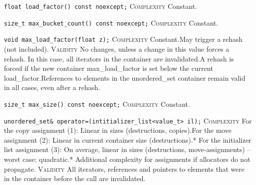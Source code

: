 \noindent{}\hspace*{0.25em}\lstinline[basicstyle=\ttfamily\color{cgreen}]{float load_factor() const noexcept;} \textsc{Complexity} Constant.\\\vspace{-0.6em}

\noindent{}\hspace*{0.25em}\lstinline[basicstyle=\ttfamily\color{cgreen}]{size_t max_bucket_count() const noexcept;} \textsc{Complexity} Constant.\\\vspace{-0.6em}

\noindent{}\hspace*{0.25em}\lstinline[basicstyle=\ttfamily\color{cgreen}]{void max_load_factor(float z);} \textsc{Complexity} Constant.May trigger a rehash (not included). \textsc{Validity} No changes, unless a change in this value forces a rehash. In this case, all iterators in the container are invalidated.A rehash is forced if the new container max\_load\_factor is set below the current load\_factor.References to elements in the unordered\_set container remain valid in all cases, even after a rehash.\\\vspace{-0.6em}

\noindent{}\hspace*{0.25em}\lstinline[basicstyle=\ttfamily\color{cgreen}]{size_t max_size() const noexcept;} \textsc{Complexity} Constant.\\\vspace{-0.6em}

\noindent{}\hspace*{0.25em}\lstinline[basicstyle=\ttfamily\color{corange}]{unordered_set& operator=(intitializer_list<value_t> il);} \textsc{Complexity} For the copy assignment (1): Linear in sizes (destructions, copies).For the move assignment (2): Linear in current container size (destructions).* For the initializer list assignment (3): On average, linear in sizes (destructions, move-assignments) -- worst case: quadratic.* Additional complexity for assignments if allocators do not propagate. \textsc{Validity} All iterators, references and pointers to elements that were in the container before the call are invalidated.\\\vspace{-0.6em}

